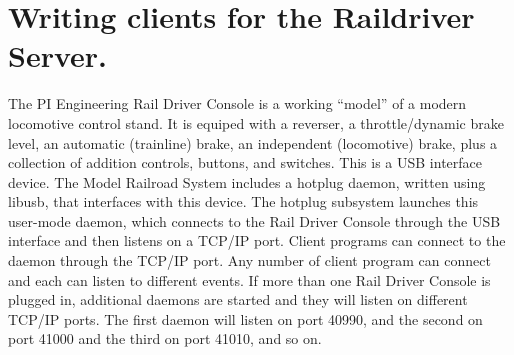 
\chapter{Writing clients for the Raildriver Server.}
\label{chapt:rd:RaildriverServer}

The PI Engineering Rail Driver Console is a working ``model'' of a
modern locomotive control stand.  It is equiped with a reverser, a
throttle/dynamic brake level, an automatic (trainline) brake, an
independent (locomotive) brake, plus a collection of addition controls,
buttons, and switches.  This is a USB interface device.  The Model
Railroad System includes a hotplug daemon, written using libusb, that
interfaces with this device.  The hotplug subsystem launches this
user-mode daemon, which connects to the Rail Driver Console through the
USB interface and then listens on a TCP/IP port.  Client programs can
connect to the daemon through the TCP/IP port.  Any number of client
program can connect and each can listen to different events.  If more
than one Rail Driver Console is plugged in, additional daemons are
started and they will listen on different TCP/IP ports. The first daemon
will listen on port 40990, and the second on port 41000 and the third on
port 41010, and so on.

